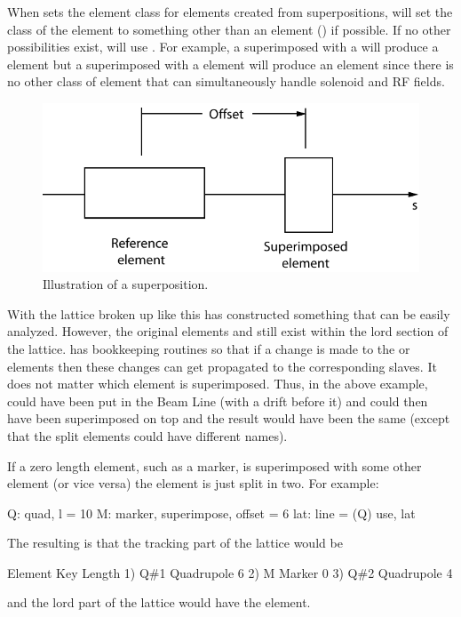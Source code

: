 When \bmad sets the element class for elements created from
superpositions, \bmad will set the class of the element to something
other than an  element () if
possible. If no other possibilities exist, \bmad will use
. For example, a  superimposed with a
 will produce a  element but a 
superimposed with a  element will produce an
 element since there is no other class of element that
can simultaneously handle solenoid and RF fields.

\begin{figure}[tb]
\centering 
\includegraphics{superimpose.pdf} 
\caption[Superposition Illustration.]
{Illustration of a superposition.}
\label{f:superimpose}
\end{figure}

With the lattice broken up like this \bmad has constructed something
that can be easily analyzed. However, the original elements  and
 still exist within the lord section of the lattice. \bmad has
bookkeeping routines so that if a change is made to the  or
 elements then these changes can get propagated to the
corresponding slaves. It does not matter which element is
superimposed. Thus, in the above example,  could have been put
in the Beam Line (with a drift before it) and  could then have
been superimposed on top and the result would have been the same
(except that the split elements could have different names).

If a zero length element, such as a marker, is superimposed with some
other element (or vice versa) the element is just split in two. For
example:
\begin{example}
  Q: quad, l = 10
  M: marker, superimpose, offset = 6
  lat: line = (Q)
  use, lat
\end{example}
The resulting is that the tracking part of the lattice would be
\begin{example}
        Element   Key           Length
  1)    Q{\#}1       Quadrupole    6
  2)    M         Marker        0
  3)    Q{\#}2       Quadrupole    4
\end{example}
and the lord part of the lattice would have the  element.
 
